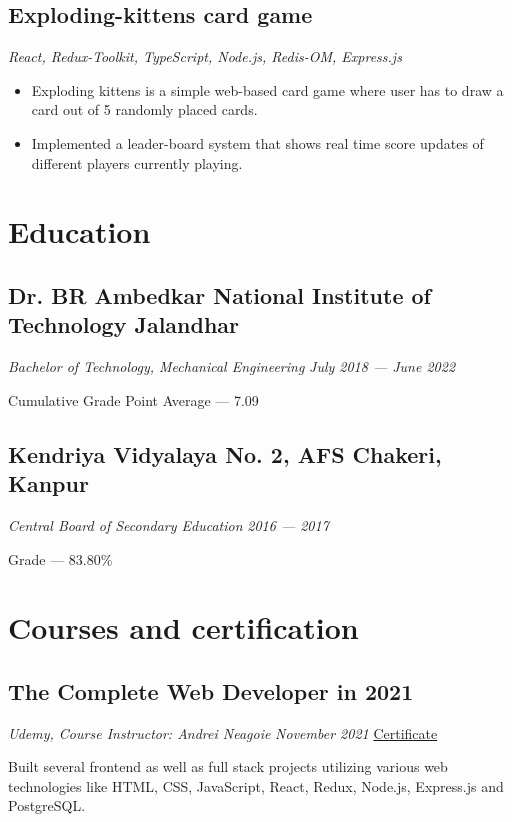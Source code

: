\documentclass[a4paper]{article}
\begin{document}
\subsection{Exploding-kittens card game}
\textit{React, Redux-Toolkit, TypeScript, Node.js, Redis-OM, Express.js}
\hfill
\href{https://exploding-kittens.netlify.app/}{ \faLink }
\textbar
\href{https://github.com/jatinkumar-me/exploding-kittens}{ \faCode}
\begin{itemize}
    \item Exploding kittens is a simple web-based card game where user has to draw a card out of 5 randomly placed cards. 
    \item Implemented a leader-board system that shows real time score updates of different players currently playing.
\end{itemize}


\section{Education}
\subsection{Dr. BR Ambedkar National Institute of Technology Jalandhar}
\textit{Bachelor of Technology, Mechanical Engineering}
\hfill
\textit{July 2018 --- June 2022}

Cumulative Grade Point Average --- 7.09

\subsection{Kendriya Vidyalaya No. 2, AFS Chakeri, Kanpur}
\textit{Central Board of Secondary Education}
\hfill
\textit{2016 --- 2017}

Grade --- 83.80\%

\section{Courses and certification}
\subsection{The Complete Web Developer in 2021}
\textit{Udemy, Course Instructor: Andrei Neagoie}
\hfill
\textit{November 2021} \textbar \href{https://www.udemy.com/certificate/UC-13ddb4ce-86c8-4396-9cb7-701f5c522fd8/}{  Certificate \faExternalLink}

Built several frontend as well as full stack projects utilizing various web technologies like HTML, CSS, JavaScript, React, Redux, Node.js, Express.js and PostgreSQL.
\end{document}

